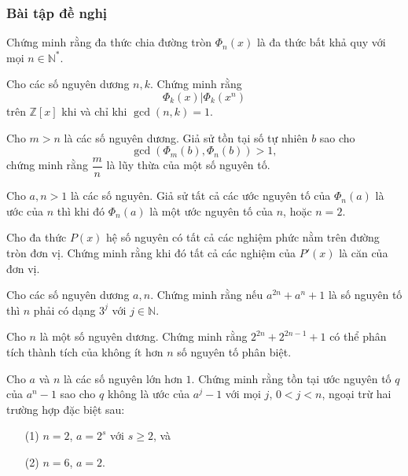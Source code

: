 \subsubsection{Bài tập đề nghị}
\begin{bt}
	Chứng minh rằng đa thức chia đường tròn $\Phi_n (x)$ là đa thức bất khả quy với mọi $n \in \mathbb{N}^*$.
\end{bt}
\begin{bt}
	Cho các số nguyên dương $n,k$. Chứng minh rằng $$\Phi_k(x) | \Phi_k (x^n) $$ trên $\mathbb{Z}[x]$ khi và chỉ khi $\gcd (n,k)=1$.
\end{bt}
\begin{bt}
	Cho $m>n$ là  các số nguyên dương. Giả sử tồn tại số tự nhiên $b$ sao cho $$\gcd \left( \Phi_m (b), \Phi_n (b) \right) >1,$$ chứng minh rằng $\dfrac{m}{n}$ là lũy thừa của một số nguyên tố.
\end{bt}
\begin{bt}
	Cho $a,n>1$ là các số nguyên. Giả sử tất cả các ước nguyên tố của $\Phi_n(a)$ là ước của $n$ thì khi đó $\Phi_n(a)$ là một ước nguyên tố của $n$, hoặc $n=2$.
\end{bt}
\begin{bt}
	Cho đa thức $P(x)$ hệ số nguyên có tất cả các nghiệm phức nằm trên đường tròn đơn vị. Chứng minh rằng khi đó tất cả các nghiệm của $P'(x)$ là căn của đơn vị.
\end{bt}
\begin{bt}Cho các số nguyên dương $a,n$. Chứng minh rằng nếu $a^{2n}+a^n+1$ là số nguyên tố thì $n$ phải có dạng $3^{j}$ với $j\in \mathbb{N}$.
\end{bt}

\begin{bt}
	Cho $n$ là một số nguyên dương. Chứng minh rằng $2^{2n}+2^{2n-1}+1$ có thể phân tích thành tích của không ít hơn $n$ số nguyên tố phân biệt.
\end{bt}

\begin{bt}
	Cho $a$ và $n$ là các số nguyên lớn hơn $1$. Chứng minh rằng tồn tại ước nguyên tố $q$ của $a^n-1$ sao cho $q$ không là ước của $a^{j}-1$ với mọi $j$, $0<j<n$, ngoại trừ hai trường hợp đặc biệt sau:
	\begin{itemize}
		\item[(1)] $n=2$, $a=2^s$ với $s\ge 2$, và 
		\item[(2)] $n=6$, $a=2$.
	\end{itemize}
	
\end{bt} 

